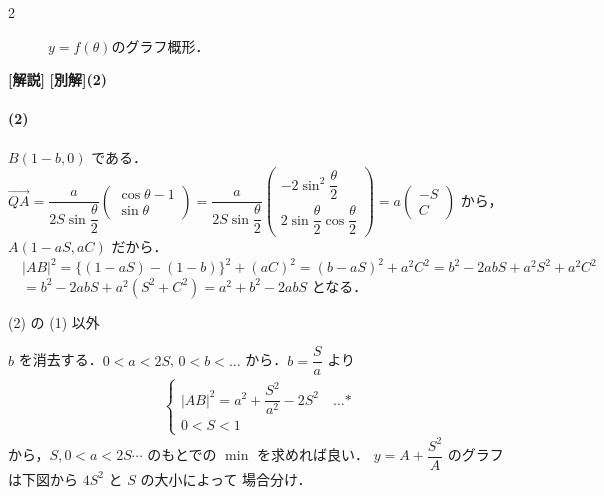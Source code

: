 \documentclass[../../main.tex]{subfiles}
\begin{document}
\begin{multicols}{2}
\begin{figure}[H]
    \caption{$y=f(\theta)$のグラフ概形．}
    \label{2005-1:fig:4}
  \end{figure}

  {\bf [解説]}
  \textbf{[別解](2)}

  \paragraph{(2)}
  $B(1-b, 0)$ である．$\overrightarrow{QA} = \dfrac{a}{2S\sin\dfrac{\theta}{2}}
  \begin{pmatrix} \cos\theta - 1 \\ \sin\theta
  \end{pmatrix} = \dfrac{a}{2S\sin\dfrac{\theta}{2}}
  \begin{pmatrix} -2\sin^2\dfrac{\theta}{2} \\ 2\sin\dfrac{\theta}{2}\cos\dfrac{\theta}{2}
  \end{pmatrix} = a
  \begin{pmatrix} -S \\ C
  \end{pmatrix}$ から，
  $A(1-aS, aC)$ だから．
  $\quad |AB|^2 = \{(1-aS)-(1-b)\}^2 + (aC)^2 = (b-aS)^2 + a^2C^2 = b^2 - 2abS + a^2S^2 + a^2C^2$
  $\quad = b^2 - 2abS + a^2(S^2+C^2) = a^2+b^2-2abS$
  となる．

  (2) の (1) 以外

  $b$ を消去する．$0 < a < 2S$, $0 < b < \dots$ から．$b=\dfrac{S}{a}$ より
  \begin{align}
    \begin{cases}
      |AB|^2 = a^2 + \dfrac{S^2}{a^2} - 2S^2 \quad \text{...*} \\
      0 < S < 1
    \end{cases}
  \end{align}
  から，$S, 0 < a < 2S \cdots$ のもとでの $\min$ を求めれば良い．
  $y = A + \dfrac{S^2}{A}$ のグラフは下図から $4S^2$ と $S$ の大小によって
  場合分け．

  \begin{figure}[H]
    \centering
\end{figure}
\end{multicols}
\end{document}
